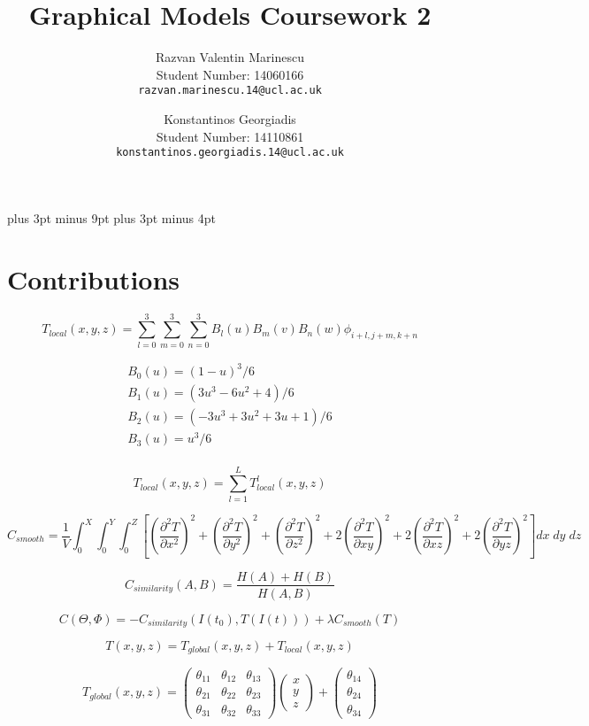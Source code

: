 \documentclass[11pt,a4paper,oneside]{report}
\title{Graphical Models Coursework 2}
\author{
    Razvan Valentin Marinescu\\
    Student Number: 14060166\\
  \texttt{razvan.marinescu.14@ucl.ac.uk}
  \and
    Konstantinos Georgiadis\\
    Student Number: 14110861\\
  \texttt{konstantinos.georgiadis.14@ucl.ac.uk}
}
\begin{document}
\belowdisplayskip=12pt plus 3pt minus 9pt
\belowdisplayshortskip=7pt plus 3pt minus 4pt

\maketitle{}

\section*{Contributions}

\begin{equation}
 T_{local}(x,y,z) = \sum_{l=0}^3\sum_{m=0}^3\sum_{n=0}^3B_{l}(u)B_{m}(v)B_{n}(w)\phi_{i+l,j+m,k+n}
\end{equation}
 
 
 \begin{gather*}
  B_0(u)=(1-u)^3/6\\
  B_1(u)=(3u^3-6u^2+4)/6\\
  B_2(u)=(-3u^3+3u^2+3u+1)/6\\
  B_3(u)=u^3/6\\
 \end{gather*}

 $$T_{local} (x,y,z) = \sum_{l=1}^L T_{local}^{l}(x,y,z) $$
 
 $$C_{smooth}=\frac{1}{V}\int_0^X\int_0^Y\int_0^Z\left[ \left(\frac{\partial^2T}{\partial x^2}\right)^2 + \left(\frac{\partial^2T}{\partial y^2}\right)^2 + \left(\frac{\partial^2T}{\partial z^2}\right)^2 + 2 \left(\frac{\partial^2T}{\partial xy}\right)^2 + 2 \left(\frac{\partial^2T}{\partial xz}\right)^2 + 2 \left(\frac{\partial^2T}{\partial yz}\right)^2 \right]dx\;dy\;dz$$
 
 $$C_{similarity}(A,B) = \frac{H(A) + H(B)}{H(A,B)} $$
 
 $$C(\Theta, \Phi)=-C_{similarity}(I(t_0), T(I(t))) + \lambda C_{smooth}(T)$$
 
 $$T(x,y,z)=T_{global}(x,y,z)+T_{local}(x,y,z)$$
 
 $$T_{global}(x,y,z)=\begin{pmatrix}
  \theta_{11}  & \theta_{12}  & \theta_{13} \\
  \theta_{21}  & \theta_{22}  & \theta_{23} \\
  \theta_{31}  & \theta_{32}  & \theta_{33}
 \end{pmatrix}\begin{pmatrix}
  x \\
  y \\
  z
 \end{pmatrix}+\begin{pmatrix}
  \theta_{14} \\
  \theta_{24} \\
  \theta_{34}
 \end{pmatrix}
 $$\\
 
\end{document}
